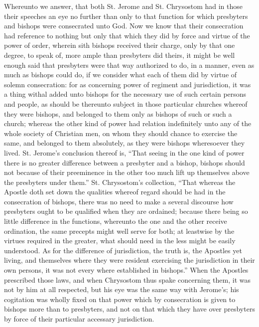 Whereunto we answer, that both St. Jerome and St. Chrysostom  had in those their speeches an eye no further than only to that function for which presbyters and bishops were consecrated unto God. Now we know that their consecration had reference to nothing but only that which they did by force and virtue of the power of order, wherein sith bishops received their charge, only by that one degree, to speak of, more ample than presbyters did theirs, it might be well enough said that presbyters were that way authorized to do, in a manner, even as much as bishops could do, if we consider what each of them did by virtue of solemn consecration: for as concerning power of regiment and jurisdiction, it was a thing withal added unto bishops for the necessary use of such certain persons and people, as should be thereunto subject in those particular churches whereof they were bishops, and belonged to them only as bishops of such or such a church; whereas the other kind of power had relation indefinitely unto any of the whole society of Christian men, on whom they should chance to exercise the same, and belonged to them absolutely, as they were bishops wheresoever they lived. St. Jerome’s conclusion thereof is, “That seeing in the one kind of power there is no greater difference between a presbyter and a bishop, bishops should not because of their preeminence in the other too much lift up themselves above the presbyters under them.” St. Chrysostom’s collection, “That whereas the Apostle doth set down the qualities whereof regard should be had in the consecration of bishops, there was no need to make a several discourse how presbyters ought to be qualified when they are ordained; because there being so little difference in the functions, whereunto the one and the other receive ordination, the same precepts might well serve for both; at leastwise by the virtues required in the greater, what should need in the less might be easily understood. As for the difference of jurisdiction, the truth is, the Apostles yet living, and themselves where they were resident exercising the jurisdiction in their own persons, it was not every where established in bishops.” When the Apostles prescribed those laws, and when Chrysostom thus spake concerning them, it was not by him at all respected, but his eye  was the same way with Jerome’s; his cogitation was wholly fixed on that power which by consecration is given to bishops more than to presbyters, and not on that which they have over presbyters by force of their particular accessary jurisdiction.

